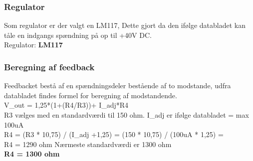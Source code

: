 \subsubsection{Regulator}
Som regulator er der valgt en LM117, Dette gjort da den ifølge databladet kan tåle en indgangs spændning på op til +40V DC. \\
Regulator: \textbf{LM117}
\subsubsection{Beregning af feedback}
Feedbacket bestå af en spændningsdeler bestående af to modstande, udfra databladet findes formel for beregning af modstandende. \\
V\_out = 1,25*(1+(R4/R3))+ I\_adj*R4 \\
R3 vælges med en standardværdi til 150 ohm. I\_adj er ifølge databladet = max 100uA \\
R4 = (R3 * 10,75) / (I\_adj +1,25) = (150 * 10,75) / (100uA * 1,25) = \\
R4 = 1290 ohm
Nærmeste standardværdi er 1300 ohm \\
\textbf{R4 = 1300 ohm}

\newpage
